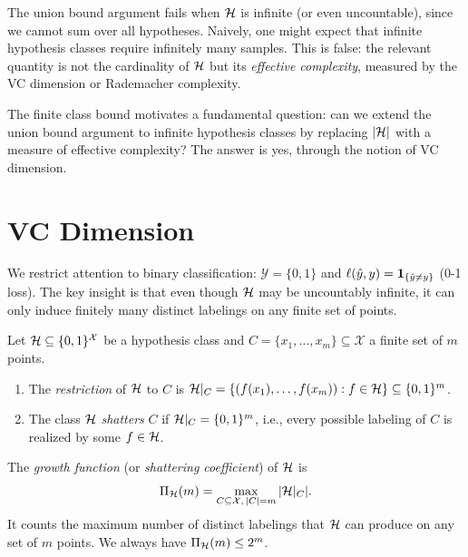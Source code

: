 \documentclass[11pt,a4paper]{article}
\begin{document}
\begin{warning}[title={The Union Bound is Loose for Continuous Classes}]
The union bound argument fails when $\mathcal{H}$ is infinite (or even
uncountable), since we cannot sum over all hypotheses.  Naively,
one might expect that infinite hypothesis classes require infinitely
many samples.  This is false: the relevant quantity is not the
cardinality of $\mathcal{H}$ but its \emph{effective complexity}, measured
by the VC dimension or Rademacher complexity.
\end{warning}

The finite class bound motivates a fundamental question: can we
extend the union bound argument to infinite hypothesis classes by
replacing $|\mathcal{H}|$ with a measure of effective complexity?  The
answer is yes, through the notion of VC dimension.


\section{VC Dimension}
\label{sec:vc_dimension}

We restrict attention to binary classification:
$\mathcal{Y} = \{0, 1\}$ and $\ell(\hat{y}, y) =
\mathbf{1}_{\{\hat{y} \neq y\}}$ (0-1 loss).  The key insight is that
even though $\mathcal{H}$ may be uncountably infinite, it can only induce
finitely many distinct labelings on any finite set of points.

\begin{definition}
\label{def:shattering}
Let $\mathcal{H} \subseteq \{0, 1\}^{\mathcal{X}}$ be a hypothesis
class and $C = \{x_1, \ldots, x_m\} \subseteq \mathcal{X}$ a finite
set of $m$ points.
\begin{enumerate}[nosep,label=(\roman*)]
    \item The \emph{restriction} of $\mathcal{H}$ to $C$ is
    $\mathcal{H}|_C = \{(f(x_1), \ldots, f(x_m)) : f \in \mathcal{H}\}
    \subseteq \{0,1\}^m$.
    \item The class $\mathcal{H}$ \emph{shatters} $C$ if
    $\mathcal{H}|_C = \{0, 1\}^m$, i.e., every possible labeling of $C$
    is realized by some $f \in \mathcal{H}$.
\end{enumerate}
\end{definition}

\begin{definition}
\label{def:growth_function}
The \emph{growth function} (or \emph{shattering coefficient}) of
$\mathcal{H}$ is
\[
    \Pi_{\mathcal{H}}(m) = \max_{C \subseteq \mathcal{X}, \, |C| = m}
    |\mathcal{H}|_C|.
\]
It counts the maximum number of distinct labelings that $\mathcal{H}$
can produce on any set of $m$ points.  We always have
$\Pi_{\mathcal{H}}(m) \leq 2^m$.
\end{definition}
\end{document}
